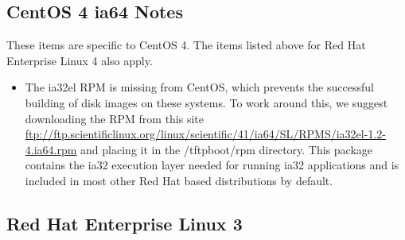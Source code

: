 \subsection{CentOS 4 ia64 Notes}
\label{subsec:centos4notes}

These items are specific to CentOS 4.  The items listed above for Red Hat
Enterprise Linux 4 also apply.

\begin{itemize}

\item The ia32el RPM is missing from CentOS, which prevents the successful
building of disk images on these systems.  To work around this, we suggest
downloading the RPM from this site \url{ftp://ftp.scientificlinux.org/linux/scientific/41/ia64/SL/RPMS/ia32el-1.2-4.ia64.rpm}
and placing it in the /tftpboot/rpm directory.  This package contains the
ia32 execution layer needed for running ia32 applications and is included
in most other Red Hat based distributions by default.

\end{itemize}


\subsection{Red Hat Enterprise Linux 3}
\label{subsec:rhel3notes}

